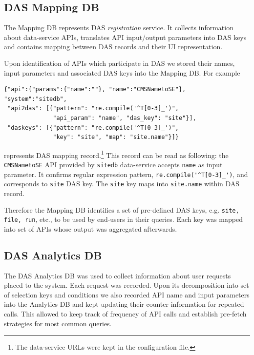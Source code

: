 \documentclass[1p,times]{elsarticle}
\begin{document}
\subsection{DAS Mapping DB}
The Mapping DB represents DAS {\it registration} service. It collects
information about data-service APIs, translates API input/output
parameters into DAS keys and contains mapping between DAS records
and their UI representation.

Upon identification of APIs which participate in DAS 
we stored their names, input parameters and associated DAS keys
into the Mapping DB. For example
\begin{verbatim}
{"api":{"params":{"name":""}, "name":"CMSNametoSE"}, "system":"sitedb",
 "api2das": [{"pattern": "re.compile('^T[0-3]_')", 
              "api_param": "name", "das_key": "site"}], 
 "daskeys": [{"pattern": "re.compile('^T[0-3]_')", 
              "key": "site", "map": "site.name"}]}
\end{verbatim}
represents DAS mapping record.\footnote{
The data-service URLs were kept in the configuration file.
}
This record can be read as following:
the \verb+CMSNametoSE+ API provided by 
\verb+sitedb+ data-service accepts \verb+name+ as input parameter. It
confirms regular expression pattern, \verb+re.compile('^T[0-3]_')+, and
corresponds to \verb+site+ DAS key. The \verb+site+ key
maps into \verb+site.name+ within DAS record. 

Therefore the Mapping DB identifies a set of pre-defined DAS keys, 
e.g. \verb+site, file, run+, etc., to be used by end-users in their queries.
Each key was mapped into set of APIs whose output was aggregated afterwards. 

\subsection{DAS Analytics DB}
The DAS Analytics DB was used to collect information
about user requests placed to the system. Each request was recorded. Upon its
decomposition into set of selection keys and conditions we also recorded
API name and input parameters into the Analytics DB and 
kept updating their counter information for repeated calls. 
This allowed to keep track of frequency of API calls and establish 
pre-fetch strategies for most common queries.
\end{document}
